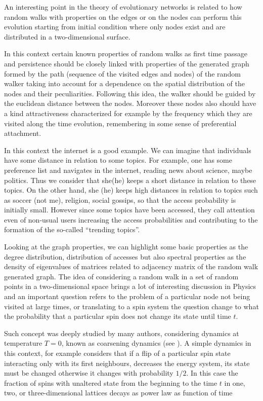 \documentclass[3p, 11pt]{elsarticle}
\begin{document}
An interesting point in the theory of evolutionary networks is related to
how random walks with properties on the edges or on the nodes can perform
this evolution starting from initial condition where only nodes exist and
are distributed in a two-dimensional surface.

In this context certain known properties of random walks as first time
passage \cite{Feller1968} and persistence \cite%
{Majundar1996,Derrida,RdasilvaPersistence} should be closely linked with
properties of the generated graph formed by the path (sequence of the
visited edges and nodes) of the random walker taking into account for a
dependence on the spatial distribution of the nodes and their peculiarities.
Following this idea, the walker should be guided by the euclidean distance
between the nodes. Moreover these nodes also should have a kind
attractiveness characterized for example by the frequency which they are
visited along the time evolution, remembering in some sense of preferential
attachment.

In this context the internet is a good example. We can imagine that
individuals have some distance in relation to some topics. For example, one
has some preference list and navigates in the internet, reading news about
science, maybe politics. Thus we consider that she(he) keeps a short
distance in relation to these topics. On the other hand, she (he) keeps high
distances in relation to topics such as soccer (not me), religion, social
gossips, so that the access probability is initially small. However since
some topics have been accessed, they call attention even of non-usual users
increasing the access probabilities and contributing to the formation of the
so-called \textquotedblleft trending topics\textquotedblright .

Looking at the graph properties, we can highlight some basic properties as
the degree distribution, distribution of accesses but also spectral
properties as the density of eigenvalues of matrices related to adjacency
matrix of the random walk generated graph. The idea of considering a random
walk in a set of random points in a two-dimensional space brings a lot of
interesting discussion in Physics and an important question refers to the
problem of a particular node not being visited at large times, or
translating to a spin system the question change to what the probability
that a particular spin does not change its state until time $t$.

Such concept was deeply studied by many authors, considering dynamics at
temperature $T=0$, known as coarsening dynamics (see \cite{Derrida}). A
simple dynamics in this context, for example considers that if a flip of a
particular spin state interacting only with its first neighbours, decreases
the energy system, its state must be changed otherwise it changes with
probability $1/2$. In this case the fraction of spins with unaltered state
from the beginning to the time $t$ in one, two, or three-dimensional
lattices decays as power law as function of time
\end{document}
